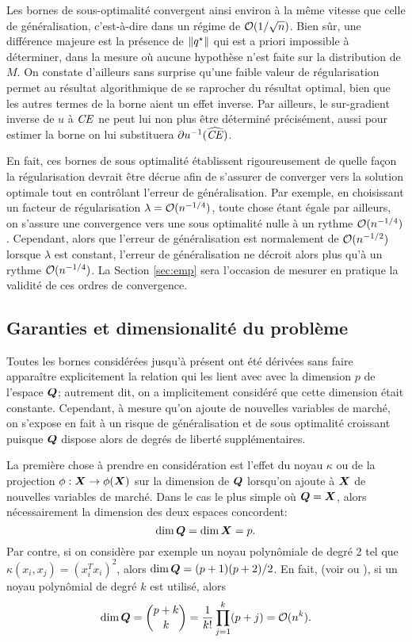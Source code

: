Les bornes de sous-optimalité convergent ainsi environ à la même vitesse que celle de
généralisation, c'est-à-dire dans un régime de $\mathcal O(1/\sqrt{n})$. Bien sûr, une
différence majeure est la présence de $\|q^\star\|$ qui est a priori impossible à déterminer,
dans la mesure où aucune hypothèse n'est faite sur la distribution de $M$. On constate
d'ailleurs sans surprise qu'une faible valeur de régularisation permet au résultat
algorithmique de se raprocher du résultat optimal, bien que les autres termes de la borne
aient un effet inverse. Par ailleurs, le sur-gradient inverse de $u$ à $\operatorname{\mbox{\textit{CE}}}$ ne peut lui
non plus être déterminé précisément, aussi pour estimer la borne on lui substituera
$\partial u^{-1}(\operatorname{\widehat{\operatorname{\mbox{\textit{CE}}}}})$.

En fait, ces bornes de sous optimalité établissent rigoureusement de quelle façon la
régularisation devrait être décrue afin de s'assurer de converger vers la solution
optimale tout en contrôlant l'erreur de généralisation. Par exemple, en choisissant un
facteur de régularisation $\lambda = \mathcal O(n^{-1/4})$, toute chose étant égale par ailleurs, on
s'assure une convergence vers une sous optimalité nulle à un rythme
$\mathcal O(n^{-1/4})$. Cependant, alors que l'erreur de généralisation est normalement de
$\mathcal O(n^{-1/2})$ lorsque $\lambda$ est constant, l'erreur de généralisation ne décroit alors
plus qu'à un rythme $\mathcal O(n^{-1/4})$. La Section \ref{sec:emp} sera l'occasion de mesurer
en pratique la validité de ces ordres de convergence. 




\subsection{Garanties et dimensionalité du problème}
\label{b:dim}

Toutes les bornes considérées jusqu'à présent ont été dérivées sans faire apparaître
explicitement la relation qui les lient avec avec la dimension $p$ de l'espace $\bm Q$;
autrement dit, on a implicitement considéré que cette dimension était
constante. Cependant, à mesure qu'on ajoute de nouvelles variables de marché, on s'expose
en fait à un risque de généralisation et de sous optimalité croissant puisque $\bm Q$ dispose
alors de degrés de liberté supplémentaires.

La première chose à prendre en considération est l'effet du noyau $\kappa$ ou de la projection
$\phi:\bm{X}\to\phi(\bm{X})$ sur la dimension de $\bm Q$ lorsqu'on ajoute à $\bm{X}$ de nouvelles variables de
marché. Dans le cas le plus simple où $\bm Q = \bm{X}$, alors nécessairement la dimension des
deux espaces concordent:
\begin{equation}
  \dim\bm Q = \dim\bm{X} = p.
\end{equation}
Par contre, si on considère par exemple un noyau polynômiale de degré 2 tel que
$\kappa(x_i,x_j) = (x_i^Tx_i)^2$, alors $\dim\bm Q = (p+1)(p+2)/2$. En fait, (voir
\cite{mohri2012foundations} ou \cite{bishop2006pattern}), si un noyau polynômial de degré
$k$ est utilisé, alors
\begin{equation}
  \dim\bm Q = \binom{p+k}{k} = \frac{1}{k!}\prod_{j=1}^k(p+j) = \mathcal O(n^k).
\end{equation}

